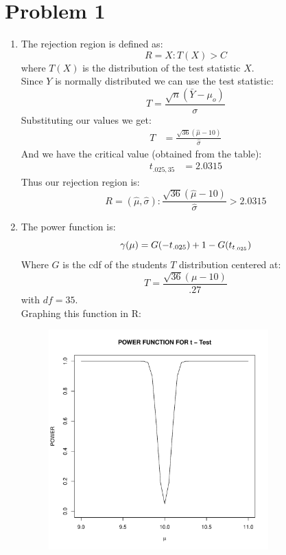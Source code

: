 \documentclass{article}
\title{\thetitle}
\author{\theauthor}
\begin{document}
\maketitle
\section*{Problem 1}
\begin{enumerate}
\item The rejection region is defined as: \\
\[
R = {X : T(X) > C}
\]
where $T(X)$ is the distribution of the test statistic $X$. \\
Since $Y$ is normally distributed we can use the test statistic: \\
\[
T = \frac{\sqrt{n}(\bar{Y} - \mu_o)}{\sigma}
\]
Substituting our values we get: \\
\begin{align*}
T &= \frac{\sqrt{36}(\hat{\mu} - 10)}{\hat{\sigma}} 
\end{align*}
And we have the critical value (obtained from the table): \\
\begin{align*}
t_{.025, 35} &= 2.0315
\end{align*}
Thus our rejection region is: \\
\[
R = {(\hat{\mu}, \hat{\sigma}) : \frac{\sqrt{36}(\hat{\mu} - 10)}{\hat{\sigma}} > 2.0315}
\]
\item The power function is: \\
\[
\gamma(\mu) = G(-t_{.025}) + 1 - G(t_{t_{.025}}) \\
\]
Where $G$ is the cdf of the students $T$ distribution centered at:
\[
T = \frac{\sqrt{36}(\mu - 10)}{.27}
\]
with $df = 35$. \\
Graphing this function in R: \\
\begin{figure}[htbp]
  \centering
  \includegraphics[width=0.8\textwidth]{Rplots.pdf}

\end{figure}
\end{enumerate}
\end{document}
